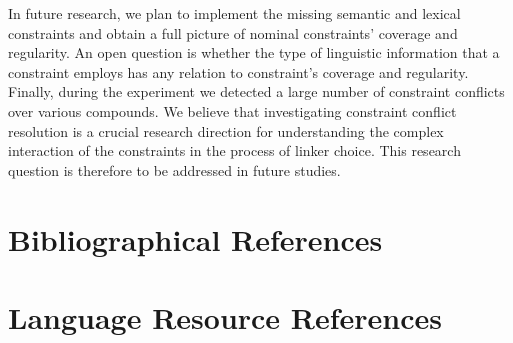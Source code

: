 \documentclass[10pt, a4paper]{article}
\begin{document}
In future research, we plan to implement the missing semantic and lexical constraints and obtain a full picture of nominal constraints' coverage and regularity. An open question is whether the type of linguistic information that a constraint employs has any relation to constraint's coverage and regularity. Finally, during the experiment we detected a large number of constraint conflicts over various compounds. We believe that investigating constraint conflict resolution is a crucial research direction for understanding the complex interaction of the constraints in the process of linker choice. This research question is therefore to be addressed in future studies.


\section{Bibliographical References}\label{sec:reference}




\section{Language Resource References}
\label{lr:ref}
\end{document}
